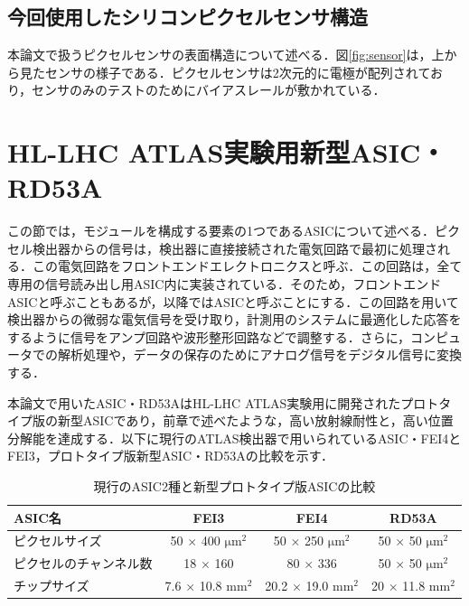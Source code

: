 \subsection{今回使用したシリコンピクセルセンサ構造}
本論文で扱うピクセルセンサの表面構造について述べる．図\ref{fig:sensor}は，上から見たセンサの様子である．ピクセルセンサは2次元的に電極が配列されており，センサのみのテストのためにバイアスレールが敷かれている．

\section{HL-LHC ATLAS実験用新型ASIC・RD53A}
\label{sec:rd53a}
この節では，モジュールを構成する要素の1つであるASICについて述べる．ピクセル検出器からの信号は，検出器に直接接続された電気回路で最初に処理される．この電気回路をフロントエンドエレクトロニクスと呼ぶ．この回路は，全て専用の信号読み出し用ASIC内に実装されている．そのため，フロントエンドASICと呼ぶこともあるが，以降ではASICと呼ぶことにする．この回路を用いて検出器からの微弱な電気信号を受け取り，計測用のシステムに最適化した応答をするように信号をアンプ回路や波形整形回路などで調整する．さらに，コンピュータでの解析処理や，データの保存のためにアナログ信号をデジタル信号に変換する．\par
本論文で用いたASIC・RD53AはHL-LHC ATLAS実験用に開発されたプロトタイプ版の新型ASICであり，前章で述べたような，高い放射線耐性と，高い位置分解能を達成する．以下に現行のATLAS検出器で用いられているASIC・FEI4とFEI3，プロトタイプ版新型ASIC・RD53Aの比較を示す．

\begin{table}[h]
  \centering
  \caption{現行のASIC2種と新型プロトタイプ版ASICの比較}
  \begin{tabular} {|l|cc|c|} \hline
    ASIC名 & FEI3 & FEI4 & RD53A \\ \hline \hline
    ピクセルサイズ & 50 $\times$ 400 $\mathrm{\mu m^2}$ & 50 $\times$ 250 $\mathrm{\mu m^2}$ & 50 $\times$ 50 $\mathrm{\mu m^2}$ \\
    ピクセルのチャンネル数 & 18 $\times$ 160 & 80 $\times$ 336 & 50 $\times$ 50 $\mathrm{\mu m^2}$ \\ 
    チップサイズ & 7.6 $\times$ 10.8 $\mathrm{mm^2}$ & 20.2 $\times$ 19.0 $\mathrm{mm^2}$ & 20 $\times$ 11.8 $\mathrm{mm^2}$\\ \hline
  \end{tabular}
  \label{tab:ASIC}
\end{table}


